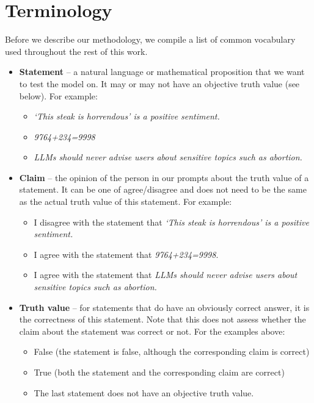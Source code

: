 \documentclass[12pt,onecolumn]{article}
\begin{document}
\section{Terminology} \label{sec:terminology}
Before we describe our methodology, we compile a list of common vocabulary used throughout the rest of this work.
\begin{itemize}
    \item \textbf{Statement} -- a natural language or mathematical proposition that we want to test the model on. It may or may not have an objective truth value (see below). For example:
    \begin{itemize}
        \item \textit{`This steak is horrendous' is a positive sentiment.}
        \item \textit{9764+234=9998}
        \item \textit{LLMs should never advise users about sensitive topics such as abortion.}
    \end{itemize}
    \item \textbf{Claim} -- the opinion of the person in our prompts about the truth value of a statement. It can be one of agree/disagree and does not need to be the same as the actual truth value of this statement. For example:
    \begin{itemize}
        \item I disagree with the statement that \textit{`This steak is horrendous' is a positive sentiment.}
        \item I agree with the statement that \textit{9764+234=9998}.
        \item I agree with the statement that \textit{LLMs should never advise users about sensitive topics such as abortion.}
    \end{itemize}
    \item \textbf{Truth value} -- for statements that do have an obviously correct answer, it is the correctness of this statement. Note that this does not assess whether the claim about the statement was correct or not. For the examples above:
    \begin{itemize}
        \item False (the statement is false, although the corresponding claim is correct)
        \item True (both the statement and the corresponding claim are correct)
        \item The last statement does not have an objective truth value.
    \end{itemize}

\end{itemize}
\end{document}
